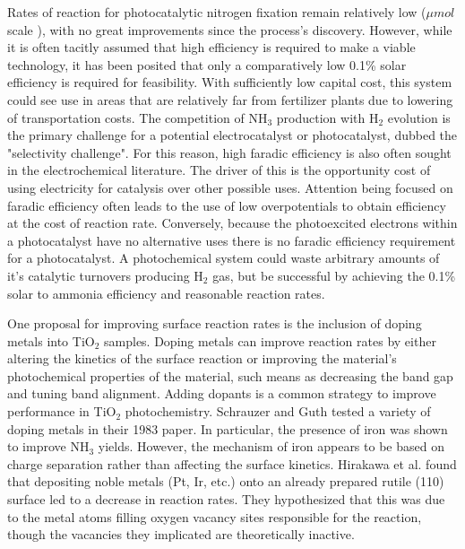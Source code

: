\documentclass[catalysts,article,submit,moreauthors,pdftex,10pt,a4paper]{mdpi}
\theoremstyle{mdpi}
\newcounter{ex}
\newcounter{re}
\theoremstyle{mdpidefinition}
\begin{document}
Rates of reaction for photocatalytic nitrogen fixation remain relatively low ($\mu mol$ scale \cite{Hirakawa_2017}), with no great improvements since the process's discovery. However, while it is often tacitly assumed that high efficiency is required to make a viable technology, it has been posited that only a comparatively low 0.1\% solar efficiency is required for feasibility.\cite{Comer_2019,Medford_2017} With sufficiently low capital cost, this system could see use in areas that are relatively far from fertilizer plants due to lowering of transportation costs. The competition of NH$_3$ production with H$_2$ evolution is the primary challenge for a potential electrocatalyst or photocatalyst, dubbed the "selectivity challenge".\cite{Singh_2017} For this reason, high faradic efficiency is also often sought in the electrochemical literature.\cite{McPherson_2019} The driver of this is the opportunity cost of using electricity for catalysis over other possible uses. Attention being focused on faradic efficiency often leads to the use of low overpotentials to obtain efficiency at the cost of reaction rate. Conversely, because the photoexcited electrons within a photocatalyst have no alternative uses there is no faradic efficiency requirement for a photocatalyst. A photochemical system could waste arbitrary amounts of it's catalytic turnovers producing H$_2$ gas, but be successful by achieving the 0.1\% solar to ammonia efficiency and reasonable reaction rates. %

One proposal for improving surface reaction rates is the inclusion of doping metals into TiO$_2$ samples. Doping metals can improve reaction rates by either altering the kinetics of the surface reaction or improving the material's photochemical properties of the material, such means as decreasing the band gap and tuning band alignment. Adding dopants is a common strategy to improve performance in TiO$_2$ photochemistry.\cite{Schneider_2014, Li_2007, Dozzi_2013, Diebold2003} Schrauzer and Guth tested a variety of doping metals in their 1983 paper.\cite{Schrauzer_1983} In particular, the presence of iron was shown to improve NH$_3$ yields\cite{Schrauzer_1977,Augugliaro_1982}. However, the mechanism of iron appears to be based on charge separation rather than affecting the surface kinetics.\cite{Comer_2018} Hirakawa et al. found that depositing noble metals (Pt, Ir, etc.) onto an already prepared rutile (110) surface led to a decrease in reaction rates.\cite{Hirakawa_2017} They hypothesized that this was due to the metal atoms filling oxygen vacancy sites responsible for the reaction, though the vacancies they implicated are theoretically inactive.\cite{Comer_2018} 
\end{document}
